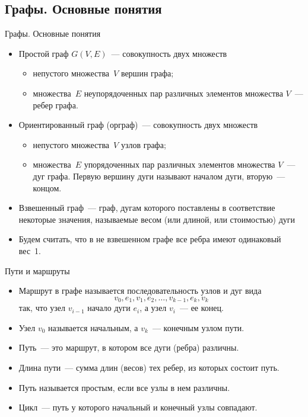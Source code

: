 \documentclass[unicode,11pt,notheorems]{beamer}
\begin{document}
\subsection{Графы. Основные понятия}
\begin{frame}{Графы. Основные понятия}
	\begin{itemize}
	\item 
		\alert{Простой граф} $G(V, E)$~--- совокупность двух множеств
		\begin{itemize}
		\item 
			непустого множества~$V$ \alert{вершин графа};
		\item 
			множества~$E$ неупорядоченных пар различных элементов множества $V$~--- \alert{ребер графа}.
		\end{itemize}
	\item 	
		\alert{Ориентированный граф (орграф)}~--- совокупность двух множеств
				\begin{itemize}
				\item 
					непустого множества~$V$ \alert{узлов графа};
				\item 
					множества~$E$ упорядоченных пар различных элементов множества $V$~--- \alert{дуг графа}.
					Первую вершину дуги называют началом дуги, вторую~--- концом.
				\end{itemize}
	\item 	
		\alert{Взвешенный граф}~--- граф, дугам которого поставлены в соответствие некоторые значения, называемые весом (или длиной, или стоимостью) дуги 
	\item 	
		Будем считать, что в не взвешенном графе  все ребра имеют одинаковый вес~1.


\end{itemize}

\end{frame}

\begin{frame}{Пути и маршруты}
	\begin{itemize}
	\item 
		\alert{Маршрут} в графе называется последовательность узлов
		и дуг вида 
		$$
			v_0, e_1, v_1, e_2, \ldots, v_{k-1}, e_k, v_k 
		$$
		так, что узел $v_{i-1}$ начало дуги $e_i$, а узел $v_i$~--- ее конец. 
	\item 
		Узел $v_0$ 	называется \alert{начальным}, а $v_k$~--- \alert{конечным} узлом пути.
	\item
		\alert{Путь}~--- это маршрут, в котором все дуги (ребра) различны. 		
	\item 
		\alert{Длина пути}~--- сумма длин (весов) тех ребер, из которых состоит путь.	
\end{itemize}

\begin{itemize}
	\item 
		Путь называется \alert{простым}, если все узлы в нем различны.
	\item 
		\alert{Цикл}~--- путь у которого начальный и конечный узлы совпадают.	
\end{itemize}

\end{frame}
\end{document}
